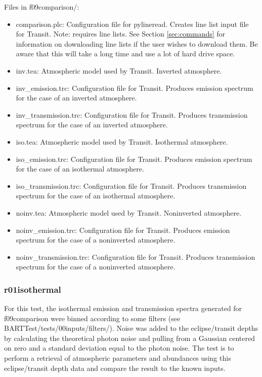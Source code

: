 \documentclass[letterpaper, 12pt]{article}
\begin{document}
Files in f09comparison/:
\begin{itemize} \itemsep0pt
  \item comparison.plc: Configuration file for pylineread. Creates 
        line list input file for Transit. Note: requires line lists. See 
        Section \ref{sec:commands} for information on downloading line lists if 
        the user wishes to download them. Be aware that this will take a long 
        time and use a lot of hard drive space.
  \item inv.tea: Atmospheric model used by Transit. Inverted atmosphere.
  \item inv{\_}emission.trc: Configuration file for Transit. Produces 
        emission spectrum for the case of an inverted atmosphere.
  \item inv{\_}transmission.trc: Configuration file for Transit. Produces 
        transmission spectrum for the case of an inverted atmosphere.
  \item iso.tea: Atmospheric model used by Transit. Isothermal atmosphere.
  \item iso{\_}emission.trc: Configuration file for Transit. Produces 
        emission spectrum for the case of an isothermal atmosphere.
  \item iso{\_}transmission.trc: Configuration file for Transit. Produces 
        transmission spectrum for the case of an isothermal atmosphere.
  \item noinv.tea: Atmospheric model used by Transit. Noninverted atmosphere.
  \item noinv{\_}emission.trc: Configuration file for Transit. Produces 
        emission spectrum for the case of a noninverted atmosphere.
  \item noinv{\_}transmission.trc: Configuration file for Transit. Produces 
        transmission spectrum for the case of a noninverted atmosphere.
\end{itemize}

\subsubsection{r01isothermal}
\label{sec:retrievals}
For this test, the isothermal emission and transmission spectra generated for 
f09comparison were binned according to some filters (see 
BARTTest/tests/00inputs/filters/). Noise was added to the eclipse/transit 
depths by calculating the theoretical photon noise and pulling from a Gaussian 
centered on zero and a standard deviation equal to the photon noise. The test 
is to perform a retrieval of atmospheric parameters and abundances using this 
eclipse/transit depth data and compare the result to the known inputs.
\end{document}
